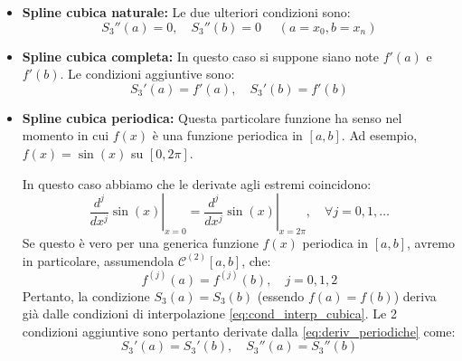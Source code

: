 \begin{itemize}
    \item \textbf{Spline cubica naturale:} Le due ulteriori condizioni sono:
    \begin{equation}
        S_3''(a) = 0, \quad S_3''(b) = 0    \text{ }\text{ } (a=x_0, b=x_n)
    \end{equation} 
    
    \item \textbf{Spline cubica completa:} In questo caso si suppone siano note $f'(a)$ e $f'(b)$. Le condizioni aggiuntive sono:
    \begin{equation}
        S_3'(a) = f'(a), \quad S_3'(b) = f'(b)
    \end{equation} 
    
    \item \textbf{Spline cubica periodica:} Questa particolare funzione ha senso nel momento in cui $f(x)$ è una funzione periodica in $[a,b]$. Ad esempio, $f(x) = \sin(x)$ su $[0, 2\pi]$.
    
    \begin{center}
    \end{center}
    
    In questo caso abbiamo che le derivate agli estremi coincidono:
    $$ \left. \frac{d^j}{dx^j} \sin(x) \right|_{x=0} = \left. \frac{d^j}{dx^j} \sin(x) \right|_{x=2\pi}, \quad \forall j=0,1,\dots $$
    Se questo è vero per una generica funzione $f(x)$ periodica in $[a,b]$, avremo in particolare, assumendola $\mathcal{C}^{(2)}[a,b]$, che:
    \begin{equation} \label{eq:deriv_periodiche}
    f^{(j)}(a) = f^{(j)}(b), \quad j=0,1,2
    \end{equation}
    Pertanto, la condizione $S_3(a) = S_3(b)$ (essendo $f(a)=f(b)$) deriva già dalle condizioni di interpolazione \eqref{eq:cond_interp_cubica}. Le 2 condizioni aggiuntive sono pertanto derivate dalla \eqref{eq:deriv_periodiche} come:
    \begin{equation}
    S_3'(a) = S_3'(b), \quad S_3''(a) = S_3''(b)
    \end{equation}
    

\end{itemize}
